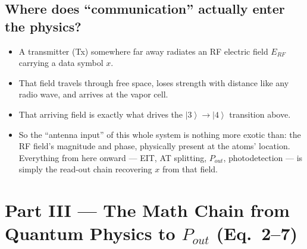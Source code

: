 \documentclass[11pt]{article}
\newcommand{\ket}[1]{\left|#1\right\rangle}
\begin{document}
\subsection*{Where does ``communication'' actually enter the physics?}
\begin{itemize}
\item A transmitter (Tx) somewhere far away radiates an RF electric field $E_{RF}$ carrying a data symbol $x$.
\item That field travels through free space, loses strength with distance like any radio wave, and arrives at the vapor cell.
\item That arriving field is exactly what drives the $\ket{3}\to\ket{4}$ transition above.
\item So the ``antenna input'' of this whole system is nothing more exotic than: the RF field's magnitude and phase, physically present at the atoms' location. Everything from here onward --- EIT, AT splitting, $P_{out}$, photodetection --- is simply the read-out chain recovering $x$ from that field.
\end{itemize}

\newpage
\section{Part III --- The Math Chain from Quantum Physics to $P_{out}$ (Eq.~2--7)}

\begin{center}
\end{center}
\end{document}

